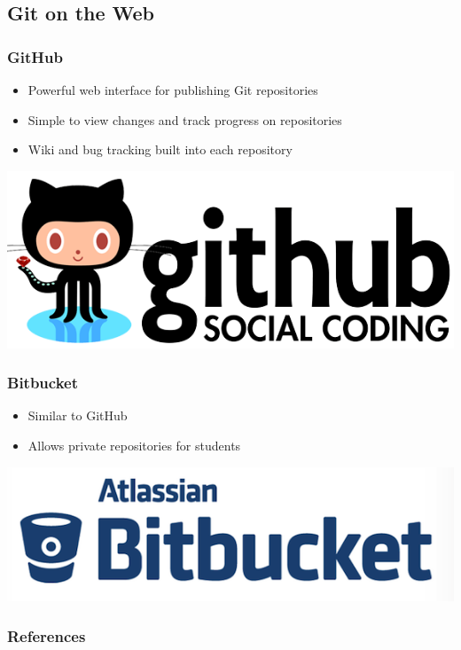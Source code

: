 \documentclass[english,compress]{beamer}
\begin{document}
\subsection{Git on the Web}
\frame
{
    \frametitle{GitHub}

    \begin{itemize}
        \item Powerful web interface for publishing Git repositories
        \item Simple to view changes and track progress on repositories
        \item Wiki and bug tracking built into each repository 
    \end{itemize}
    
    \begin{center}
        \includegraphics[width=.8\textwidth]{figs/github-logo.png}
    \end{center}
}

\frame
{
    \frametitle{Bitbucket}

    \begin{itemize}
        \item Similar to GitHub
        \item Allows private repositories for students
    \end{itemize}
    
    \begin{center}
        \includegraphics[width=.8\textwidth]{figs/bitbucket-logo.png}
    \end{center}
}

\frame
{
\small
    \frametitle{References}
    \renewcommand{\section}[2]{}
    
    
}
\end{document}
